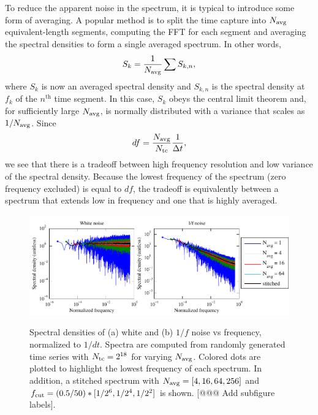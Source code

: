 To reduce the apparent noise in the spectrum, it is typical to introduce some form of averaging. A popular method is to split the time capture into $N_\text{avg}{}$ equivalent-length segments, computing the FFT for each segment and averaging the spectral densities to form a single averaged spectrum. In other words,
\begin{align}\label{eqn:Sk_averaged_def}
S_k = \frac{1}{N_\text{avg}{}} \sum S_{k,n},
\end{align}
where $S_k$ is now an averaged spectral density and $S_{k,n}$ is the spectral density at $f_k$ of the $n^\text{th}$ time segment. In this case, $S_k$ obeys the central limit theorem and, for sufficiently large $N_\text{avg}{}$, is normally distributed with a variance that scales as $1/N_\text{avg}{}$. Since
\begin{align}\label{eqn:df_Navg_def}
df = \frac{N_\text{avg}{}}{N_\text{tc}}\frac{1}{\Delta t},
\end{align}
we see that there is a tradeoff between high frequency resolution and low variance of the spectral density. Because the lowest frequency of the spectrum (zero frequency excluded) is equal to $df$, the tradeoff is equivalently between a spectrum that extends low in frequency and one that is highly averaged.

\begin{figure}
\centering\includegraphics[width=6.5in]{stitch_spec/white_pink_noise_spectra}\\
\caption[Spectral density of white and $1/f$ noise]{Spectral densities of (a) white and (b) $1/f$ noise vs frequency, normalized to $1/dt$. Spectra are computed from randomly generated time series with $N_\text{tc} = 2^{18}$ for varying $N_\text{avg}{}$. Colored dots are plotted to highlight the lowest frequency of each spectrum. In addition, a stitched spectrum with $N_\text{avg}{} = [4, 16, 64, 256]$ and $f_\text{cut}{} = (0.5/50) * [1/2^6, 1/2^4, 1/2^2]$ is shown. [@@@ Add subfigure labels].}
\label{Fig:white_pink_noise_spectra}
\end{figure}

